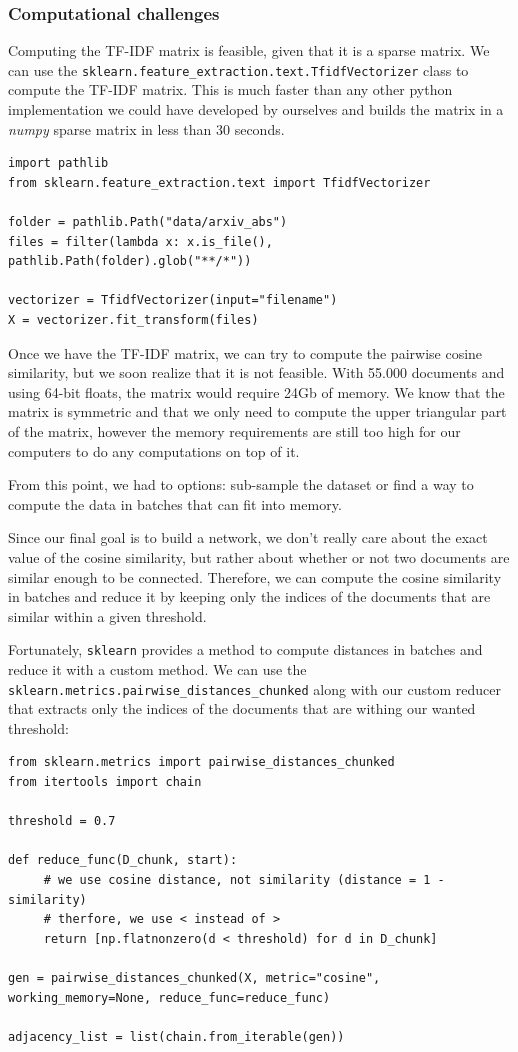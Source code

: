 \subsubsection{Computational challenges}

Computing the TF-IDF matrix is feasible, given that it is a sparse matrix. We can use
the \texttt{sklearn.feature\_extraction.text.TfidfVectorizer} class to compute the TF-IDF
matrix. This is much faster than any other python implementation we could have developed by ourselves
and builds the matrix in a \emph{numpy} sparse matrix in less than 30 seconds.

\begin{verbatim}
import pathlib
from sklearn.feature_extraction.text import TfidfVectorizer

folder = pathlib.Path("data/arxiv_abs")
files = filter(lambda x: x.is_file(), pathlib.Path(folder).glob("**/*"))

vectorizer = TfidfVectorizer(input="filename")
X = vectorizer.fit_transform(files)
\end{verbatim}

Once we have the TF-IDF matrix, we can try to compute the pairwise cosine similarity, but
we soon realize that it is not feasible. With 55.000 documents and using 64-bit floats, the
matrix would require 24Gb of memory. We know that the matrix is symmetric and that we only
need to compute the upper triangular part of the matrix, however the memory requirements
are still too high for our computers to do any computations on top of it.

From this point, we had to options: sub-sample the dataset or find a way to compute the
data in batches that can fit into memory.

Since our final goal is to build a network, we don't really care about the exact value of the
cosine similarity, but rather about whether or not two documents are similar enough to be
connected. Therefore, we can compute the cosine similarity in batches and reduce it by keeping
only the indices of the documents that are similar within a given threshold.

Fortunately, \texttt{sklearn} provides a method to compute distances in batches and reduce it
with a custom method. We can use the \texttt{sklearn.metrics.pairwise\_distances\_chunked}
along with our custom reducer that extracts only the indices of the documents that are
withing our wanted threshold:

\begin{verbatim}
from sklearn.metrics import pairwise_distances_chunked
from itertools import chain

threshold = 0.7

def reduce_func(D_chunk, start):
     # we use cosine distance, not similarity (distance = 1 - similarity)
     # therfore, we use < instead of >
     return [np.flatnonzero(d < threshold) for d in D_chunk]

gen = pairwise_distances_chunked(X, metric="cosine", working_memory=None, reduce_func=reduce_func)

adjacency_list = list(chain.from_iterable(gen))
\end{verbatim}

